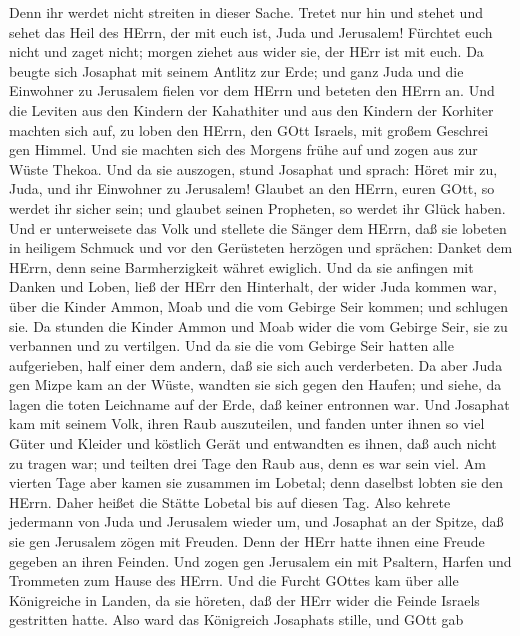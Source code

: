 Denn ihr werdet nicht streiten in dieser Sache. Tretet nur hin und
stehet und sehet das Heil des HErrn, der mit euch ist, Juda und
Jerusalem! Fürchtet euch nicht und zaget nicht; morgen ziehet aus wider
sie, der HErr ist mit euch.  Da beugte sich Josaphat mit
seinem Antlitz zur Erde; und ganz Juda und die Einwohner zu Jerusalem
fielen vor dem HErrn und beteten den HErrn an.  Und die
Leviten aus den Kindern der Kahathiter und aus den Kindern der Korhiter
machten sich auf, zu loben den HErrn, den GOtt Israels, mit großem
Geschrei gen Himmel.  Und sie machten sich des Morgens
frühe auf und zogen aus zur Wüste Thekoa. Und da sie auszogen, stund
Josaphat und sprach: Höret mir zu, Juda, und ihr Einwohner zu Jerusalem!
Glaubet an den HErrn, euren GOtt, so werdet ihr sicher sein; und glaubet
seinen Propheten, so werdet ihr Glück haben.  Und er
unterweisete das Volk und stellete die Sänger dem HErrn, daß sie lobeten
in heiligem Schmuck und vor den Gerüsteten herzögen und sprächen: Danket
dem HErrn, denn seine Barmherzigkeit währet ewiglich.  Und
da sie anfingen mit Danken und Loben, ließ der HErr den Hinterhalt, der
wider Juda kommen war, über die Kinder Ammon, Moab und die vom Gebirge
Seir kommen; und schlugen sie.  Da stunden die Kinder Ammon
und Moab wider die vom Gebirge Seir, sie zu verbannen und zu vertilgen.
Und da sie die vom Gebirge Seir hatten alle aufgerieben, half einer dem
andern, daß sie sich auch verderbeten.  Da aber Juda gen
Mizpe kam an der Wüste, wandten sie sich gegen den Haufen; und siehe, da
lagen die toten Leichname auf der Erde, daß keiner entronnen war.
 Und Josaphat kam mit seinem Volk, ihren Raub auszuteilen,
und fanden unter ihnen so viel Güter und Kleider und köstlich Gerät und
entwandten es ihnen, daß auch nicht zu tragen war; und teilten drei Tage
den Raub aus, denn es war sein viel.  Am vierten Tage aber
kamen sie zusammen im Lobetal; denn daselbst lobten sie den HErrn. Daher
heißet die Stätte Lobetal bis auf diesen Tag.  Also kehrete
jedermann von Juda und Jerusalem wieder um, und Josaphat an der Spitze,
daß sie gen Jerusalem zögen mit Freuden. Denn der HErr hatte ihnen eine
Freude gegeben an ihren Feinden.  Und zogen gen Jerusalem
ein mit Psaltern, Harfen und Trommeten zum Hause des HErrn.
 Und die Furcht GOttes kam über alle Königreiche in Landen,
da sie höreten, daß der HErr wider die Feinde Israels gestritten hatte.
 Also ward das Königreich Josaphats stille, und GOtt gab
